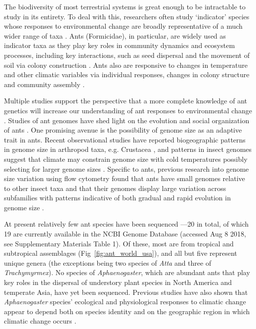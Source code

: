 \documentclass[fleqn,10pt,lineno]{wlpeerj} %
\begin{document}
The biodiversity of most terrestrial systems is great enough
to be intractable to study in its entirety. To deal with this,
researchers often study `indicator' species whose responses to
environmental change are broadly representative of a much wider range
of taxa \citep{Siddig2016}.  Ants (Formicidae), in particular, are
widely used as indicator taxa \citep{Agosti2000} as they play key
roles in community dynamics and ecosystem processes, including key
interactions, such as seed dispersal and the movement of soil via
colony construction \citep{DelToro2012}. Ants also are responsive to
changes in temperature and other climatic variables via individual
responses, changes in colony structure and community assembly
\citep{Kaspari2015, Spicer2017, Diamond2017, Diamond2018}.

Multiple studies support the perspective that a more complete
knowledge of ant genetics will increase our understanding of ant
responses to environmental change \citep{Diamond2012a, Nygaard2015,
  Stanton-Geddes, Boomsma2017, Penick2017}. Studies of ant genomes
have shed light on the evolution and social organization of ants
\citep{Libbrecht2013}. One promising avenue is the possibility of
genome size as an adaptive trait in ants. Recent observational studies
have reported biogeographic patterns in genome size in arthropod taxa,
e.g. Crustacea \citep{Hultgren2018}, and patterns in insect genomes
suggest that climate may constrain genome size with cold temperatures
possibly selecting for larger genome sizes \citep{Mousseau1997,
  Petrov2001, Alfsnes2017}. Specific to ants, previous research into
genome size variation using flow cytometry found that ants have small
genomes relative to other insect taxa and that their genomes display
large variation across subfamilies with patterns indicative of both
gradual and rapid evolution in genome size \citep{Tsutsui2008a}.

At present relatively few ant species have been sequenced ---20 in
total, of which 19 are currently available in the NCBI Genome Database
(accessed Aug 8 2018, see Supplementary Materials
Table 1). Of these, most are from tropical and
subtropical assemblages (Fig~\ref{fig:ant_world_usa}), and all but
five represent unique genera (the exceptions being two species of
\textit{Atta} and three of \textit{Trachymyrmex}). No species of
\textit{Aphaenogaster}, which are abundant ants that play key roles in
the dispersal of understory plant species in North America and
temperate Asia, have yet been sequenced. Previous studies have also
shown that \textit{Aphaenogaster} species' ecological and
physiological responses to climatic change appear to depend both on
species identity and on the geographic region in which climatic change
occurs \citep{Warren2013, Stanton-Geddes}.
\end{document}

